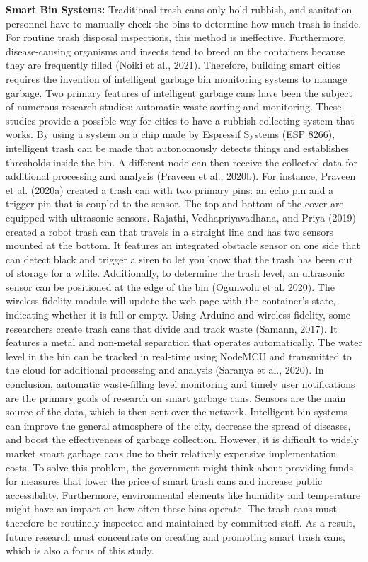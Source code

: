 \documentclass[a4paper,11pt,onecolumn]{article}
\begin{document}
\textbf{Smart Bin Systems:} Traditional trash cans only hold rubbish, and sanitation personnel have to manually check the bins to determine how much trash is inside. For routine trash disposal inspections, this method is ineffective. Furthermore, disease-causing organisms and insects tend to breed on the containers because they are frequently filled (Noiki et al., 2021). Therefore, building smart cities requires the invention of intelligent garbage bin monitoring systems to manage garbage. Two primary features of intelligent garbage cans have been the subject of numerous research studies: automatic waste sorting and monitoring. These studies provide a possible way for cities to have a rubbish-collecting system that works. By using a system on a chip made by Espressif Systems (ESP 8266), intelligent trash can be made that autonomously detects things and establishes thresholds inside the bin. A different node can then receive the collected data for additional processing and analysis (Praveen et al., 2020b).\newline
For instance, Praveen et al. (2020a) created a trash can with two primary pins: an echo pin and a trigger pin that is coupled to the sensor. The top and bottom of the cover are equipped with ultrasonic sensors. Rajathi, Vedhapriyavadhana, and Priya (2019) created a robot trash can that travels in a straight line and has two sensors mounted at the bottom. It features an integrated obstacle sensor on one side that can detect black and trigger a siren to let you know that the trash has been out of storage for a while. Additionally, to determine the trash level, an ultrasonic sensor can be positioned at the edge of the bin (Ogunwolu et al. 2020). The wireless fidelity module will update the web page with the container's state, indicating whether it is full or empty. Using Arduino and wireless fidelity, some researchers create trash cans that divide and track waste (Samann, 2017). It features a metal and non-metal separation that operates automatically. The water level in the bin can be tracked in real-time using NodeMCU and transmitted to the cloud for additional processing and analysis (Saranya et al., 2020).\newline
In conclusion, automatic waste-filling level monitoring and timely user notifications are the primary goals of research on smart garbage cans. Sensors are the main source of the data, which is then sent over the network. Intelligent bin systems can improve the general atmosphere of the city, decrease the spread of diseases, and boost the effectiveness of garbage collection. However, it is difficult to widely market smart garbage cans due to their relatively expensive implementation costs.  To solve this problem, the government might think about providing funds for measures that lower the price of smart trash cans and increase public accessibility. Furthermore, environmental elements like humidity and temperature might have an impact on how often these bins operate. The trash cans must therefore be routinely inspected and maintained by committed staff. As a result, future research must concentrate on creating and promoting smart trash cans, which is also a focus of this study.\newline \\
\end{document}
